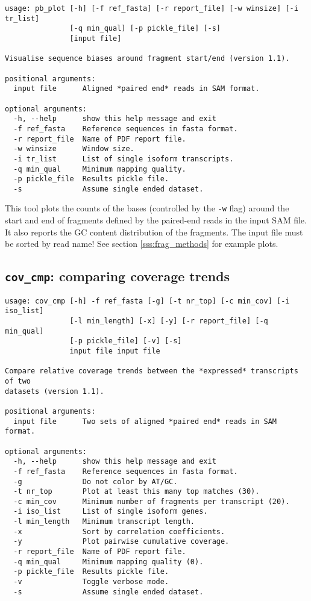 \begin{verbatim}
usage: pb_plot [-h] [-f ref_fasta] [-r report_file] [-w winsize] [-i tr_list]
               [-q min_qual] [-p pickle_file] [-s]
               [input file]

Visualise sequence biases around fragment start/end (version 1.1).

positional arguments:
  input file      Aligned *paired end* reads in SAM format.

optional arguments:
  -h, --help      show this help message and exit
  -f ref_fasta    Reference sequences in fasta format.
  -r report_file  Name of PDF report file.
  -w winsize      Window size.
  -i tr_list      List of single isoform transcripts.
  -q min_qual     Minimum mapping quality.
  -p pickle_file  Results pickle file.
  -s              Assume single ended dataset.
\end{verbatim}

This tool plots the counts of the bases (controlled by the \texttt{-w} flag) around the start and end of fragments defined by the paired-end reads in the input SAM file. It also reports the GC content distribution of the fragments. The input file must be sorted by read name!
See section \ref{sss:frag_methods} for example plots.

\subsection{{\tt cov\_cmp}: comparing coverage trends}

\begin{verbatim}
usage: cov_cmp [-h] -f ref_fasta [-g] [-t nr_top] [-c min_cov] [-i iso_list]
               [-l min_length] [-x] [-y] [-r report_file] [-q min_qual]
               [-p pickle_file] [-v] [-s]
               input file input file

Compare relative coverage trends between the *expressed* transcripts of two
datasets (version 1.1).

positional arguments:
  input file      Two sets of aligned *paired end* reads in SAM format.

optional arguments:
  -h, --help      show this help message and exit
  -f ref_fasta    Reference sequences in fasta format.
  -g              Do not color by AT/GC.
  -t nr_top       Plot at least this many top matches (30).
  -c min_cov      Minimum number of fragments per transcript (20).
  -i iso_list     List of single isoform genes.
  -l min_length   Minimum transcript length.
  -x              Sort by correlation coefficients.
  -y              Plot pairwise cumulative coverage.
  -r report_file  Name of PDF report file.
  -q min_qual     Minimum mapping quality (0).
  -p pickle_file  Results pickle file.
  -v              Toggle verbose mode.
  -s              Assume single ended dataset.
\end{verbatim}

